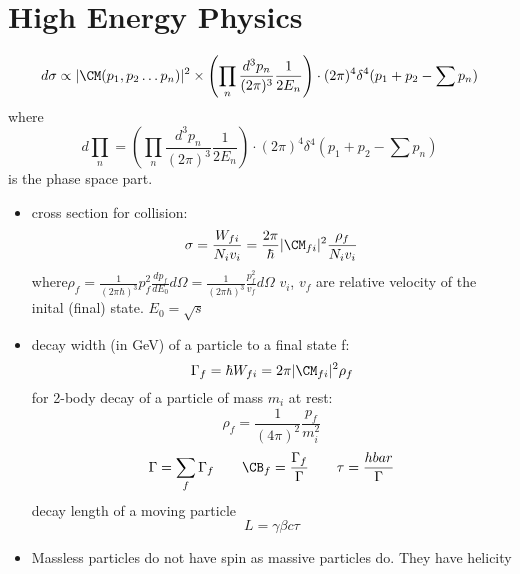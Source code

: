 \chapter{High Energy Physics}
\begin{equation}
    d\sigma \propto |\CM(p_1, p_2 \dots p_n)|^2 \times
    \left(\prod_n \frac{d^3p_n}{(2\pi)^3}\frac{1}{2E_n}\right) \cdot (2\pi)^4\delta^4(p_1 + p_2 - \sum p_n)   
\end{equation}
where
$$ d\prod_n = \left(\prod_n \frac{d^3p_n}{(2\pi)^3}\frac{1}{2E_n}\right) \cdot (2\pi)^4\delta^4(p_1 + p_2 - \sum p_n) $$
is the phase space part.
\begin{itemize}
    \item cross section for collision:
	$$ \sigma = \frac{W_{fi}}{N_i v_i} = \frac{2\pi}{\hbar}|\CM_{fi}|^2 \frac{\rho_f}{N_i v_i} $$
	where$\rho_f = \frac{1}{(2\pi\hbar)^3} p^2_f \frac{dp_f}{dE_0}d\Omega = \frac{1}{(2\pi\hbar)^3} \frac{p_f^2}{v_f}d\Omega $
	$v_i$, $v_f$ are relative velocity of the inital (final) state. $E_0 = \sqrt{s}$
    \item decay width (in GeV) of a particle to a final state f:
	$$ \Gamma_f = \hbar W_{fi} = 2\pi |\CM_{fi}|^2 \rho_f $$
	for 2-body decay of a particle of mass $m_i$ at rest:
	$$ \rho_f = \frac{1}{(4\pi)^2}\frac{p_f}{m_i^2} $$
	$$ \Gamma = \sum_f \Gamma_f \qquad \CB_f = \frac{\Gamma_f}{\Gamma} \qquad \tau = \frac{hbar}{\Gamma} $$
	decay length of a moving particle
	$$ L = \gamma\beta c\tau $$
    \item Massless particles do not have spin as massive particles do. They have 
	helicity
\end{itemize}

